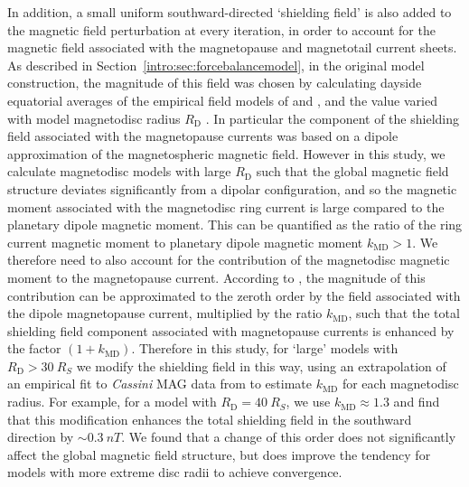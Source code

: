In addition, a small uniform southward-directed `shielding field' is also added to the magnetic field perturbation at every iteration, in order to account for the magnetic field associated with the magnetopause and magnetotail current sheets. As described in Section~\ref{intro:sec:forcebalancemodel}, in the original model construction, the magnitude of this field was chosen by calculating dayside equatorial averages of the empirical field models of \citet{alexeev2005} and \citet{alexeev2006}, and the value varied with model magnetodisc radius $R_\mathrm{D}$ \citep[see][Figure 6]{achilleos2010a}. In particular the component of the shielding field associated with the magnetopause currents was based on a dipole approximation of the magnetospheric magnetic field. However in this study, we calculate magnetodisc models with large $R_\mathrm{D}$ such that the global magnetic field structure deviates significantly from a dipolar configuration, and so the magnetic moment associated with the magnetodisc ring current is large compared to the planetary dipole magnetic moment. This can be quantified as the ratio of the ring current magnetic moment to planetary dipole magnetic moment $k_\mathrm{MD} > 1$. We therefore need to also account for the contribution of the magnetodisc magnetic moment to the magnetopause current. According to \citet{alexeev2005}, the magnitude of this contribution can be approximated to the zeroth order by the field associated with the dipole magnetopause current, multiplied by the ratio $k_\mathrm{MD}$, such that the total shielding field component associated with magnetopause currents is enhanced by the factor $(1+k_\mathrm{MD})$. Therefore in this study, for `large' models with $R_\mathrm{D} > \SI{30}{R_S}$ we modify the shielding field in this way, using an extrapolation of an empirical fit to \textit{Cassini} MAG data from \citet{bunce2007} to estimate $k_\mathrm{MD}$ for each magnetodisc radius. For example, for a model with $R_\mathrm{D} = \SI{40}{R_S}$, we use $k_\mathrm{MD}{\approx}1.3$ and find that this modification enhances the total shielding field in the southward direction by ${\sim}\SI{0.3}{nT}$. We found that a change of this order does not significantly affect the global magnetic field structure, but does improve the tendency for models with more extreme disc radii to achieve convergence.

